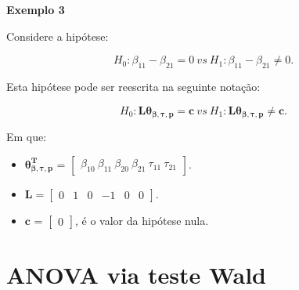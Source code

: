 \documentclass[10pt,
  aspectratio=169,
  serif,
  mathserif,
  professionalfont,
  compress,
  handout,
  ]{beamer}\usepackage[]{graphicx}\usepackage[]{color}
\begin{document}

\begin{frame}[c, allowframebreaks]

\textbf{Exemplo 3}

Considere a hipótese:

$$H_0: \beta_{11} - \beta_{21} = 0 \ vs \ H_1: \beta_{11} - \beta_{21} \neq 0.$$

Esta hipótese pode ser reescrita na seguinte notação:

$$H_0: \boldsymbol{L}\boldsymbol{\theta_{\beta,\tau,p}} = \boldsymbol{c} \ vs \ H_1: \boldsymbol{L}\boldsymbol{\theta_{\beta,\tau,p}} \neq \boldsymbol{c}.$$ 

Em que:

\begin{itemize}
  
  \item $\boldsymbol{\theta_{\beta,\tau,p}^T}$ = $\begin{bmatrix} \beta_{10} \  \beta_{11} \ \beta_{20} \ \beta_{21} \ \tau_{11} \ \tau_{21} \end{bmatrix}$.


\item $\boldsymbol{L} = \begin{bmatrix} 0 & 1 & 0 & -1 & 0 & 0  \end{bmatrix}.$
 
\item $\boldsymbol{c}$ = $\begin{bmatrix} 0 \end{bmatrix}$, é o valor da hipótese nula. 

\end{itemize}

\end{frame}


\section{ANOVA via teste Wald}
\end{document}
